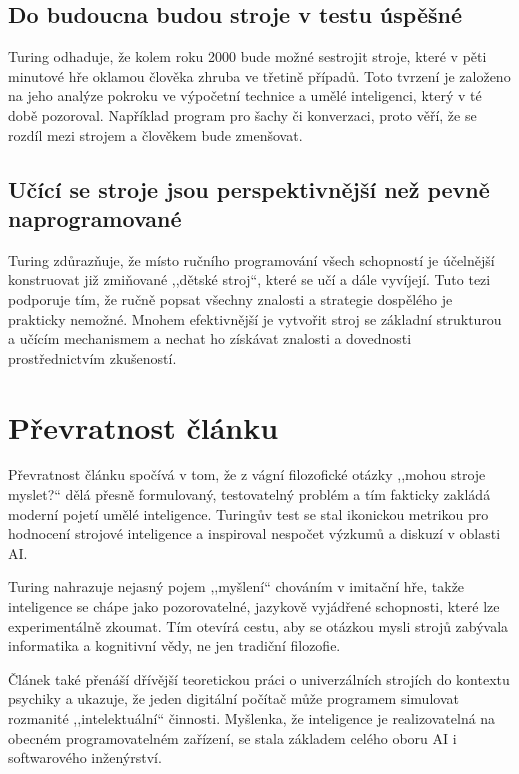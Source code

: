 \documentclass[a4paper,oneside,11pt,usenames,dvipsnames]{article}
\begin{document}
\subsection{Do budoucna budou stroje v testu úspěšné}
\label{sec:budoucnost}
Turing odhaduje, že kolem roku 2000 bude možné sestrojit stroje, které v pěti minutové hře oklamou člověka zhruba ve třetině případů.
Toto tvrzení je založeno na jeho analýze pokroku ve výpočetní technice a umělé inteligenci, který v té době pozoroval. Například program pro šachy či konverzaci, proto věří, že se rozdíl mezi strojem a člověkem bude zmenšovat.

\subsection{Učící se stroje jsou perspektivnější než pevně naprogramované}
\label{subsec:ucici-se-stroje}
Turing zdůrazňuje, že místo ručního programování všech schopností je účelnější konstruovat již zmiňované ,,dětské stroj``, které se učí a dále vyvíjejí.
Tuto tezi podporuje tím, že ručně popsat všechny znalosti a strategie dospělého je prakticky nemožné. Mnohem efektivnější je vytvořit stroj se základní strukturou a učícím mechanismem a nechat ho získávat znalosti a dovednosti prostřednictvím zkušeností.

\section{Převratnost článku}
\label{sec:prevratnost}
Převratnost článku spočívá v tom, že z vágní filozofické otázky ,,mohou stroje myslet?{}`` dělá přesně formulovaný, testovatelný problém a tím fakticky zakládá moderní pojetí umělé inteligence. Turingův test se stal ikonickou metrikou pro hodnocení strojové inteligence a inspiroval nespočet výzkumů a diskuzí v oblasti AI.

Turing nahrazuje nejasný pojem ,,myšlení`` chováním v imitační hře, takže inteligence se chápe jako pozorovatelné, jazykově vyjádřené schopnosti, které lze experimentálně zkoumat. Tím otevírá cestu, aby se otázkou mysli strojů zabývala informatika a kognitivní vědy, ne jen tradiční filozofie.

Článek také přenáší dřívější teoretickou práci o univerzálních strojích do kontextu psychiky a ukazuje, že jeden digitální počítač může programem simulovat rozmanité ,,intelektuální`` činnosti. Myšlenka, že inteligence je realizovatelná na obecném programovatelném zařízení, se stala základem celého oboru AI i softwarového inženýrství.
\end{document}

